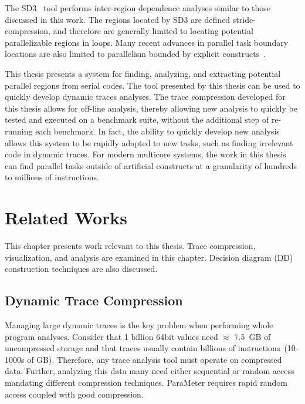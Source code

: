 \documentclass[defaultstyle,11pt]{thesis}
\begin{document}
The SD3~\cite{minjang:10:micro} tool performs inter-region dependence
analyses similar to those discussed in this work.  The regions located
by SD3 are defined stride-compression, and therefore are generally
limited to locating potential parallelizable regions in loops.  Many
recent advances in parallel task boundary locations are also limited to
parallelism bounded by explicit constructs~\cite{jeon:2011:hotpar,
  garcia:2011:pldi}.

This thesis presents a system for finding, analyzing, and extracting
potential parallel regions from serial codes.  The tool presented by
this thesis can be used to quickly develop dynamic traces analyses.
The trace compression developed for this thesis allows for off-line
analysis, thereby allowing new analysis to quickly be tested and
executed on a benchmark suite, without the additional step of
re-running each benchmark.  In fact, the ability to quickly develop new
analysis allows this system to be rapidly adapted to new tasks, such
as finding irrelevant code in dynamic traces.  For modern multicore
systems, the work in this thesis can find parallel tasks outside of
artificial constructs at a granularity of hundreds to millions of
instructions.

\chapter{Related Works}
\label{chap:background}

This chapter presents work relevant to this thesis.  Trace
compression, visualization, and analysis are examined in this chapter.
Decision diagram (DD) construction techniques are also discussed.

\section{Dynamic Trace Compression}

Managing large dynamic traces is the key problem when performing whole
program analyses. Consider that 1 billion 64bit values need $\approx$
7.5~GB of uncompressed storage and that traces usually contain
billions of instructions~(10-1000s of GB). Therefore, any trace
analysis tool must operate on compressed data. Further, analyzing this
data many need either sequential or random access mandating
different compression techniques. ParaMeter requires rapid random
access coupled with good compression.
\end{document}

